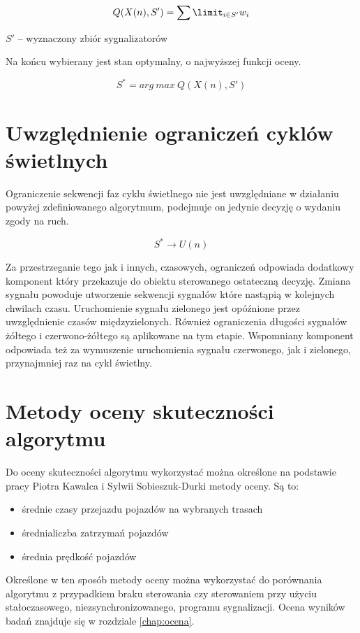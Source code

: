 \begin{equation}
\label{eq:wagi_suma}
	Q (X(n), S') = \sum\limit_{i \in S'} w_{i}
\end{equation}

\begin{math} S' \end{math} \textrm{ -- wyznaczony zbiór sygnalizatorów}

\vspace{0.5cm}
Na końcu wybierany jest stan optymalny, o najwyższej funkcji oceny.

\begin{equation}
	S^{*} = arg\:max\:Q (X(n), S')
\end{equation}

\section{Uwzględnienie ograniczeń cyklów świetlnych}
Ograniczenie sekwencji faz cyklu świetlnego nie jest uwzględniane w działaniu powyżej zdefiniowanego algorytmum, podejmuje on jedynie decyzję o wydaniu zgody na ruch.

\begin{equation}
	S^{*} \to U(n)
\end{equation}

Za przestrzeganie tego jak i innych, czasowych, ograniczeń odpowiada dodatkowy komponent który przekazuje do obiektu sterowanego ostateczną decyzję. Zmiana sygnału powoduje utworzenie sekwencji sygnałów które nastąpią w kolejnych chwilach czasu. Uruchomienie sygnału zielonego jest opóźnione przez uwzględnienie czasów międzyzielonych. Również ograniczenia długości sygnałów żółtego i czerwono-żółtego są aplikowane na tym etapie. Wspomniany komponent odpowiada też za wymuszenie uruchomienia sygnału czerwonego, jak i zielonego, przynajmniej raz na cykl świetlny.

\section{Metody oceny skuteczności algorytmu}
Do oceny skuteczności algorytmu wykorzystać można określone na podstawie pracy Piotra Kawalca i Sylwii Sobieszuk-Durki \cite{kawalec+sobieszuk-durka} metody oceny. Są to:
\begin{itemize}
	\item średnie czasy przejazdu pojazdów na wybranych trasach
	\item średnialiczba zatrzymań pojazdów
	\item średnia prędkość pojazdów
\end{itemize}

Określone w ten sposób metody oceny można wykorzystać do porównania algorytmu z przypadkiem braku sterowania czy sterowaniem przy użyciu stałoczasowego, niezsynchronizowanego, programu sygnalizacji. Ocena wyników badań znajduje się w rozdziale \ref{chap:ocena}.